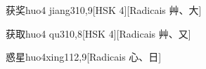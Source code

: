 \begin{entry}{获奖}{huo4 jiang3}{10,9}[HSK 4][Radicais ⾋、⼤]
\end{entry}

\begin{entry}{获取}{huo4 qu3}{10,8}[HSK 4][Radicais ⾋、⼜]
\end{entry}

\begin{entry}{惑星}{huo4xing1}{12,9}[Radicais ⼼、⽇]
\end{entry}


